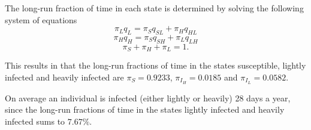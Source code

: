 The long-run fraction of time in each state is determined by solving the following system of equations
$$ \pi_L q_L = \pi_S q_{SL} + \pi_H q_{HL}$$
$$ \pi_H q_H = \pi_S q_{SH} + \pi_L q_{LH}$$
$$ \pi_S + \pi_H +\pi_L = 1 .$$

This results in that the long-run fractions of time in the states susceptible, lightly infected and heavily infected are $\pi_S = 0.9233$, $\pi_{I_H} = 0.0185$ and $\pi_{I_L} = 0.0582$. 

On average an individual is infected (either lightly or heavily) 28 days a year, since the long-run fractions of time in the states lightly infected and heavily infected sums to $7.67\%$.


